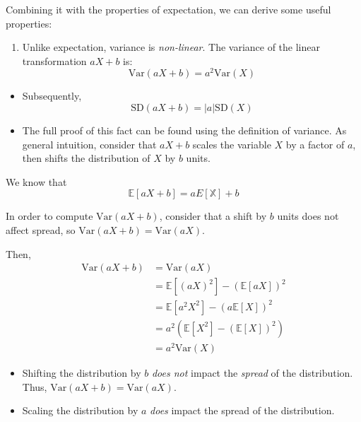 \documentclass[
  letterpaper,
  DIV=11,
  numbers=noendperiod]{scrreprt}
\providecommand{\tightlist}{%
  \setlength{\itemsep}{0pt}\setlength{\parskip}{0pt}}\usepackage{longtable,booktabs,array}
\begin{document}
Combining it with the properties of expectation, we can derive some
useful properties:

\begin{enumerate}
\def\labelenumi{\arabic{enumi}.}
\tightlist
\item
  Unlike expectation, variance is \emph{non-linear}. The variance of the
  linear transformation \(aX+b\) is:
  \[\text{Var}(aX+b) = a^2 \text{Var}(X)\]
\end{enumerate}

\begin{itemize}
\tightlist
\item
  Subsequently, \[\text{SD}(aX+b) = |a| \text{SD}(X)\]
\item
  The full proof of this fact can be found using the definition of
  variance. As general intuition, consider that \(aX+b\) scales the
  variable \(X\) by a factor of \(a\), then shifts the distribution of
  \(X\) by \(b\) units.
\end{itemize}

\begin{tcolorbox}[enhanced jigsaw, titlerule=0mm, bottomtitle=1mm, arc=.35mm, colframe=quarto-callout-tip-color-frame, rightrule=.15mm, opacityback=0, opacitybacktitle=0.6, leftrule=.75mm, breakable, toprule=.15mm, colback=white, left=2mm, colbacktitle=quarto-callout-tip-color!10!white, toptitle=1mm, bottomrule=.15mm, title=\textcolor{quarto-callout-tip-color}{\faLightbulb}\hspace{0.5em}{Proof}, coltitle=black]

We know that \[\mathbb{E}[aX+b] = aE[\mathbb{X}] + b\]

In order to compute \(\text{Var}(aX+b)\), consider that a shift by \(b\)
units does not affect spread, so \(\text{Var}(aX+b) = \text{Var}(aX)\).

Then, \[\begin{align}
    \text{Var}(aX+b) &= \text{Var}(aX) \\
    &= \mathbb{E}[(aX)^2] - (\mathbb{E}[aX])^2 \\
    &= \mathbb{E}[a^2 X^2] - (a\mathbb{E}[X])^2\\
    &= a^2 (\mathbb{E}[X^2] - (\mathbb{E}[X])^2) \\
    &= a^2 \text{Var}(X)
\end{align}\]

\end{tcolorbox}

\begin{itemize}
\tightlist
\item
  Shifting the distribution by \(b\) \emph{does not} impact the
  \emph{spread} of the distribution. Thus,
  \(\text{Var}(aX+b) = \text{Var}(aX)\).
\item
  Scaling the distribution by \(a\) \emph{does} impact the spread of the
  distribution.
\end{itemize}
\end{document}
